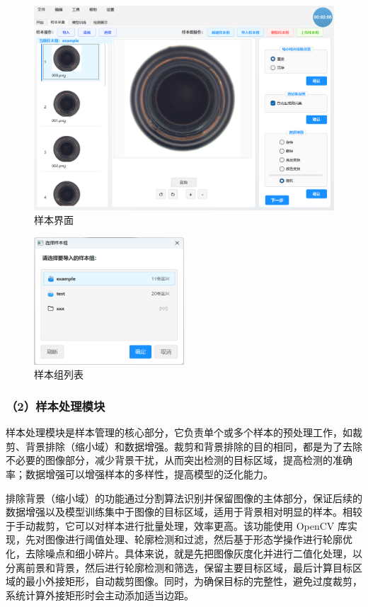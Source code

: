 \documentclass[
  ]{njuthesis}
\begin{document}
\begin{figure}[htb]
    \centering
    \includegraphics[width=\textwidth]{images/样本界面.png}
    \caption{样本界面}
    \label{样本界面}
\end{figure}

\begin{figure}[htb]
    \centering
    \includegraphics[width=0.5\textwidth]{images/样本组列表.png}
    \caption{样本组列表}
    \label{样本组列表}
\end{figure}

\subsubsection{（2）样本处理模块}

样本处理模块是样本管理的核心部分，它负责单个或多个样本的预处理工作，如裁剪、背景排除（缩小域）和数据增强。裁剪和背景排除的目的相同，都是为了去除不必要的图像部分，减少背景干扰，从而突出检测的目标区域，提高检测的准确率；数据增强可以增强样本的多样性，提高模型的泛化能力。

排除背景（缩小域）的功能通过分割算法识别并保留图像的主体部分，保证后续的数据增强以及模型训练集中于图像的目标区域，适用于背景相对明显的样本。相较于手动裁剪，它可以对样本进行批量处理，效率更高。该功能使用 OpenCV 库实现，先对图像进行阈值处理、轮廓检测和过滤，然后基于形态学操作进行轮廓优化，去除噪点和细小碎片。具体来说，就是先把图像灰度化并进行二值化处理，以分离前景和背景，然后进行轮廓检测和筛选，保留主要目标区域，最后计算目标区域的最小外接矩形，自动裁剪图像。同时，为确保目标的完整性，避免过度裁剪，系统计算外接矩形时会主动添加适当边距。
\end{document}

